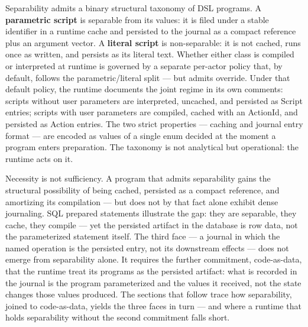 \documentclass[
]{article}
\begin{document}
Separability admits a binary structural taxonomy of DSL programs. A
\textbf{parametric script} is separable from its values: it is filed
under a stable identifier in a runtime cache and persisted to the
journal as a compact reference plus an argument vector. A
\textbf{literal script} is non-separable: it is not cached, runs once as
written, and persists as its literal text. Whether either class is
compiled or interpreted at runtime is governed by a separate per-actor
policy that, by default, follows the parametric/literal split --- but
admits override. Under that default policy, the runtime documents the
joint regime in its own comments: scripts without user parameters are
interpreted, uncached, and persisted as Script entries; scripts with
user parameters are compiled, cached with an ActionId, and persisted as
Action entries. The two strict properties --- caching and journal entry
format --- are encoded as values of a single enum decided at the moment
a program enters preparation. The taxonomy is not analytical but
operational: the runtime acts on it.

Necessity is not sufficiency. A program that admits separability gains
the structural possibility of being cached, persisted as a compact
reference, and amortizing its compilation --- but does not by that fact
alone exhibit dense journaling. SQL prepared statements illustrate the
gap: they are separable, they cache, they compile --- yet the persisted
artifact in the database is row data, not the parameterized statement
itself. The third face --- a journal in which the named operation is the
persisted entry, not its downstream effects --- does not emerge from
separability alone. It requires the further commitment, code-as-data,
that the runtime treat its programs as the persisted artifact: what is
recorded in the journal is the program parameterized and the values it
received, not the state changes those values produced. The sections that
follow trace how separability, joined to code-as-data, yields the three
faces in turn --- and where a runtime that holds separability without
the second commitment falls short.
\end{document}
